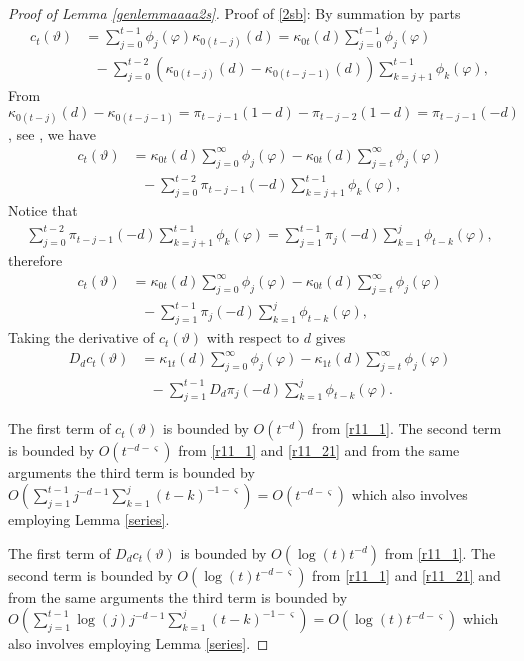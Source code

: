 {{\begin{proof}[Proof of Lemma \ref{genlemmaaaa2s}]
Proof of \eqref{2sb}: 
By summation by parts 
\begin{align*}
    c_t(\vartheta) &=  \sum_{j = 0}^{t-1} \phi_j(\varphi) \kappa_{0(t-j)}(d) = \kappa_{0t}(d) \sum_{j = 0}^{t-1} \phi_j(\varphi) \\
    &\ \ \ - \sum_{j = 0}^{t-2} \left(\kappa_{0(t-j)}(d) - \kappa_{0(t-j-1)}(d) \right)
    \sum_{k = j+1}^{t-1}  \phi_k(\varphi),
\end{align*}
From $\kappa_{0(t-j)}(d) - \kappa_{0(t-j-1)} = \pi_{t-j-1}(1-d) - \pi_{t-j-2}(1-d) = \pi_{t-j-1}(-d)$, see \textcite[Lemma A.4]{johansen2016role}, we have
\begin{align*}
     c_t(\vartheta) &=  \kappa_{0t}(d) \sum_{j = 0}^{\infty} \phi_j(\varphi) -  \kappa_{0t}(d) \sum_{j = t}^{\infty} \phi_j(\varphi) \\
    &\ \ \ - \sum_{j = 0}^{t-2} \pi_{t-j-1}(-d) 
    \sum_{k = j+1}^{t-1}  \phi_k(\varphi),
\end{align*}
Notice that 
\begin{align*}
     \sum_{j = 0}^{t-2} \pi_{t-j-1}(-d) 
    \sum_{k = j+1}^{t-1}  \phi_k(\varphi) = \sum_{j = 1}^{t-1} \pi_j(-d) \sum_{k = 1}^j  \phi_{t-k}(\varphi),
\end{align*}
therefore
\begin{align}
     c_t(\vartheta) &= \kappa_{0t}(d) \sum_{j = 0}^{\infty} \phi_j(\varphi) -  \kappa_{0t}(d) \sum_{j = t}^{\infty} \phi_j(\varphi) \nonumber \\
      &\ \ \ - \sum_{j = 1}^{t-1} \pi_j(-d) \sum_{k = 1}^j  \phi_{t-k}(\varphi), \label{2sbcc}
\end{align}
Taking the derivative of $c_t(\vartheta)$ with respect to $d$ gives
\begin{align*}
    D_{d}   c_t(\vartheta) &= \kappa_{1t}(d) \sum_{j = 0}^{\infty} \phi_j(\varphi) -  \kappa_{1t}(d) \sum_{j = t}^{\infty} \phi_j(\varphi) \\
      &\ \ \ - \sum_{j = 1}^{t-1} D_d \pi_j(-d) \sum_{k = 1}^j  \phi_{t-k}(\varphi).
\end{align*}

The first term of $c_t(\vartheta)$ is bounded by $O(t^{-d})$ from \eqref{r11_1}. The second term is bounded 
by $O(t^{-d-\varsigma})$ from \eqref{r11_1} and \eqref{r11_21} and from the same arguments the third term is bounded by $O\left(\sum_{j = 1}^{t-1}j^{-d-1} \sum_{k = 1}^j  (t-k)^{-1-\varsigma}  \right) = O(t^{-d-\varsigma})$ which also involves employing Lemma \ref{series}. 


The first term of $D_{d} c_t(\vartheta)$ is bounded by $O(\log(t) t^{-d})$ from \eqref{r11_1}. The second term is bounded by $O(\log(t)t^{-d-\varsigma})$ from \eqref{r11_1} and \eqref{r11_21} and from the same arguments the third term is bounded by $O\left(\sum_{j = 1}^{t-1} \log(j) j^{-d-1} \sum_{k = 1}^j  (t-k)^{-1-\varsigma}  \right) = O(\log(t) t^{-d-\varsigma})$ which also involves employing Lemma \ref{series}. 


\end{proof}}}
